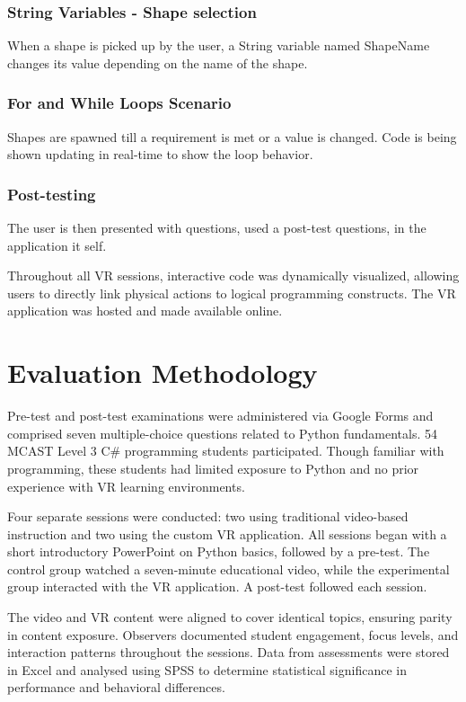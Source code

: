 \documentclass[conference]{IEEEtran}
\begin{document}
\subsubsection{String Variables - Shape selection}
When a shape is picked up by the user, a String variable named ShapeName changes its value depending on the name of the shape.

\subsubsection{For and While Loops Scenario}
Shapes are spawned till a requirement is met or a value is changed. Code is being shown updating in real-time to show the loop behavior.

\subsubsection{Post-testing}
The user is then presented with questions, used a post-test questions, in the application it self. 

Throughout all VR sessions, interactive code was dynamically visualized, allowing users to directly link physical actions to logical programming constructs. The VR application was hosted and made available online.

\section{Evaluation Methodology}

Pre-test and post-test examinations were administered via Google Forms and comprised seven multiple-choice questions related to Python fundamentals. 54 MCAST Level 3 C\# programming students participated. Though familiar with programming, these students had limited exposure to Python and no prior experience with VR learning environments.

Four separate sessions were conducted: two using traditional video-based instruction and two using the custom VR application. All sessions began with a short introductory PowerPoint on Python basics, followed by a pre-test. The control group watched a seven-minute educational video, while the experimental group interacted with the VR application. A post-test followed each session.

The video and VR content were aligned to cover identical topics, ensuring parity in content exposure. Observers documented student engagement, focus levels, and interaction patterns throughout the sessions. Data from assessments were stored in Excel and analysed using SPSS to determine statistical significance in performance and behavioral differences.
\end{document}
